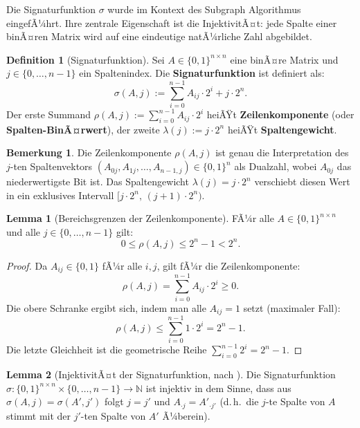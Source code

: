﻿\documentclass[a4paper,12pt]{scrreprt}
\theoremstyle{definition}
\newtheorem{definition}{Definition}[section]
\newtheorem{bemerkung}{Bemerkung}[section]
\newtheorem{lemma}{Lemma}[section]
\begin{document}
Die Signaturfunktion $\sigma$ wurde im Kontext des Subgraph Algorithmus \cite{Epp26a} eingefÃ¼hrt. Ihre zentrale Eigenschaft ist die InjektivitÃ¤t: jede Spalte einer binÃ¤ren Matrix wird auf eine eindeutige natÃ¼rliche Zahl abgebildet.

\begin{definition}[Signaturfunktion]
	\label{def:sigma}
	Sei $A \in \{0,1\}^{n \times n}$ eine binÃ¤re Matrix und $j \in \{0,\ldots,n-1\}$ ein Spaltenindex. Die \textbf{Signaturfunktion} ist definiert als:
	\[
	\sigma(A, j) := \sum_{i=0}^{n-1} A_{ij} \cdot 2^i + j \cdot 2^n.
	\]
	Der erste Summand $\rho(A,j) := \sum_{i=0}^{n-1} A_{ij} \cdot 2^i$ heiÃŸt \textbf{Zeilenkomponente} (oder \textbf{Spalten-BinÃ¤rwert}), der zweite $\lambda(j) := j \cdot 2^n$ heiÃŸt \textbf{Spaltengewicht}.
\end{definition}

\begin{bemerkung}
	Die Zeilenkomponente $\rho(A,j)$ ist genau die Interpretation des $j$-ten Spaltenvektors $(A_{0j}, A_{1j}, \ldots, A_{n-1,j}) \in \{0,1\}^n$ als Dualzahl, wobei $A_{0j}$ das niederwertigste Bit ist. Das Spaltengewicht $\lambda(j) = j \cdot 2^n$ verschiebt diesen Wert in ein exklusives Intervall $[j \cdot 2^n,\, (j+1) \cdot 2^n)$.
\end{bemerkung}

\begin{lemma}[Bereichsgrenzen der Zeilenkomponente]
	\label{lem:rho-bounds}
	FÃ¼r alle $A \in \{0,1\}^{n \times n}$ und alle $j \in \{0,\ldots,n-1\}$ gilt:
	\[
	0 \leq \rho(A,j) \leq 2^n - 1 < 2^n.
	\]
\end{lemma}

\begin{proof}
	Da $A_{ij} \in \{0,1\}$ fÃ¼r alle $i, j$, gilt fÃ¼r die Zeilenkomponente:
	\[
	\rho(A,j) = \sum_{i=0}^{n-1} A_{ij} \cdot 2^i \geq 0.
	\]
	Die obere Schranke ergibt sich, indem man alle $A_{ij} = 1$ setzt (maximaler Fall):
	\[
	\rho(A,j) \leq \sum_{i=0}^{n-1} 1 \cdot 2^i = 2^n - 1.
	\]
	Die letzte Gleichheit ist die geometrische Reihe $\sum_{i=0}^{n-1} 2^i = 2^n - 1$.
\end{proof}

\begin{lemma}[InjektivitÃ¤t der Signaturfunktion, nach \cite{Epp26a}]
	\label{lem:inj}
	Die Signaturfunktion $\sigma: \{0,1\}^{n \times n} \times \{0,\ldots,n-1\} \to \mathbb{N}$ ist injektiv in dem Sinne, dass aus $\sigma(A,j) = \sigma(A',j')$ folgt $j = j'$ und $A_{\cdot j} = A'_{\cdot j'}$ (d.\,h.\ die $j$-te Spalte von $A$ stimmt mit der $j'$-ten Spalte von $A'$ Ã¼berein).
\end{lemma}
\end{document}
